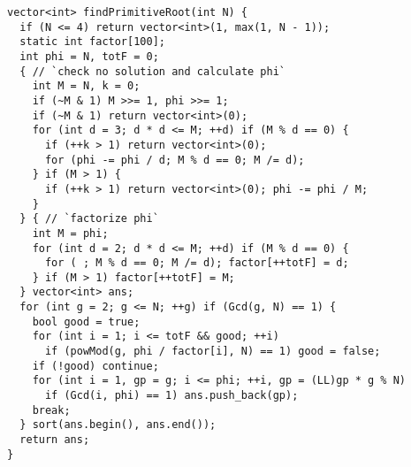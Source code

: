 \begin{lstlisting}
vector<int> findPrimitiveRoot(int N) {
  if (N <= 4) return vector<int>(1, max(1, N - 1));
  static int factor[100];
  int phi = N, totF = 0;
  { // `check no solution and calculate phi`
    int M = N, k = 0;
    if (~M & 1) M >>= 1, phi >>= 1;
    if (~M & 1) return vector<int>(0);
    for (int d = 3; d * d <= M; ++d) if (M % d == 0) {
      if (++k > 1) return vector<int>(0);
      for (phi -= phi / d; M % d == 0; M /= d);
    } if (M > 1) {
      if (++k > 1) return vector<int>(0); phi -= phi / M;
    }
  } { // `factorize phi`
    int M = phi;
    for (int d = 2; d * d <= M; ++d) if (M % d == 0) {
      for ( ; M % d == 0; M /= d); factor[++totF] = d;
    } if (M > 1) factor[++totF] = M;
  } vector<int> ans;
  for (int g = 2; g <= N; ++g) if (Gcd(g, N) == 1) {
    bool good = true;
    for (int i = 1; i <= totF && good; ++i)
      if (powMod(g, phi / factor[i], N) == 1) good = false;
    if (!good) continue;
    for (int i = 1, gp = g; i <= phi; ++i, gp = (LL)gp * g % N)
      if (Gcd(i, phi) == 1) ans.push_back(gp);
    break;
  } sort(ans.begin(), ans.end());
  return ans;
}
\end{lstlisting}